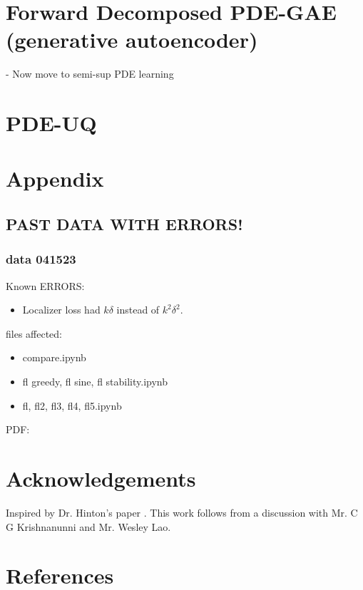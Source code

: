 \section{Forward Decomposed PDE-GAE (generative autoencoder)}
- Now move to semi-sup PDE learning

\section{PDE-UQ}

\section{Appendix}
\subsection{PAST DATA WITH ERRORS!}
\subsubsection{data 041523}
Known ERRORS:
\begin{itemize}
    \item Localizer loss had $k\delta$ instead of $k^2 \delta^2$. 
\end{itemize}
files affected:

\begin{itemize}
\item compare.ipynb
\item fl greedy, fl sine, fl stability.ipynb
\item fl, fl2, fl3, fl4, fl5.ipynb
\end{itemize}

PDF:



\section{Acknowledgements}
Inspired by Dr. Hinton's paper \cite{FFA23}.
This work follows from a discussion with Mr. C G Krishnanunni and Mr. Wesley Lao.
\section{References}

